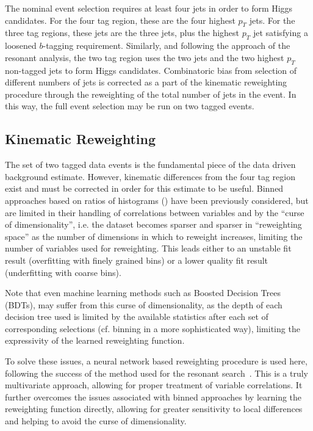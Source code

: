 The nominal event selection requires at least four jets in order to form Higgs
candidates. For the four tag region, these are the four highest $p_{T}$ \btagged 
jets. For the three tag regions, these jets are the three \btagged jets, plus the 
highest $p_{T}$ jet satisfying a loosened $b$-tagging requirement. Similarly, and following 
the approach of the resonant analysis, the two tag region uses the two \btagged jets 
and the two highest $p_{T}$ non-tagged jets to form Higgs candidates. Combinatoric bias 
from selection of different numbers of \btagged jets is corrected as a part of the kinematic 
reweighting procedure through the reweighting of the total number of jets in the event. In this way, 
the full event selection may be run on two tagged events. 

\subsection{Kinematic Reweighting}
The set of two tagged data events is the fundamental piece of the data driven
background estimate. However, kinematic differences from the four tag region
exist and must be corrected in order for this estimate to be useful. Binned 
approaches based on ratios of histograms ()
have been previously considered, but are limited in their handling of correlations 
between variables and by the ``curse of dimensionality'', i.e. the dataset
becomes sparser and sparser in ``reweighting space'' as the number of dimensions
in which to reweight increases, limiting the number of variables used for reweighting. 
This leads either to an unstable fit result (overfitting with finely grained bins) or a 
lower quality fit result (underfitting with coarse bins).

Note that even machine learning methods such as Boosted Decision Trees (BDTs), may suffer
from this curse of dimensionality, as the depth of each decision tree used is limited by 
the available statistics after each set of corresponding selections (cf. binning in a 
more sophisticated way), limiting the expressivity of the learned reweighting function.

To solve these issues, a neural network based reweighting procedure is used
here, following the success of the method used for the resonant search~\cite{Abbott:2708605}. 
This is a truly multivariate approach, allowing for proper treatment of
variable correlations. It further overcomes the issues associated with binned
approaches by learning the reweighting function directly, allowing for greater
sensitivity to local differences and helping to avoid the curse of
dimensionality.


